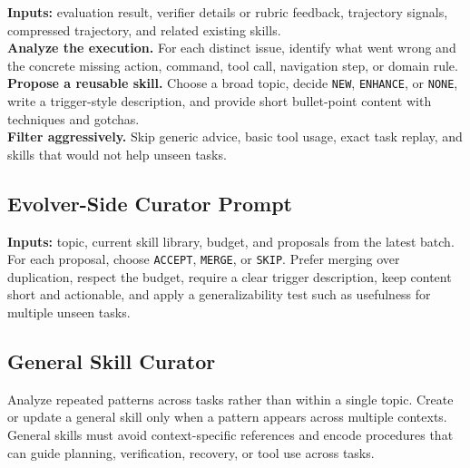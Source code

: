 \begin{tcolorbox}[breakable, colback=gray!5, colframe=gray!50, fontupper=\small,
title={\small Proposal prompt, compressed}]
\textbf{Inputs:} evaluation result, verifier details or rubric feedback,
trajectory signals, compressed trajectory, and related existing skills.\\[2pt]
\textbf{Analyze the execution.}
For each distinct issue, identify what went wrong and the concrete missing
action, command, tool call, navigation step, or domain rule.\\[2pt]
\textbf{Propose a reusable skill.}
Choose a broad topic, decide \texttt{NEW}, \texttt{ENHANCE}, or \texttt{NONE},
write a trigger-style description, and provide short bullet-point content with
techniques and gotchas.\\[2pt]
\textbf{Filter aggressively.}
Skip generic advice, basic tool usage, exact task replay, and skills that would
not help unseen tasks.
\end{tcolorbox}

\subsection{Evolver-Side Curator Prompt}

\begin{tcolorbox}[breakable, colback=gray!5, colframe=gray!50, fontupper=\small,
title={\small Curator prompt, compressed}]
\textbf{Inputs:} topic, current skill library, budget, and proposals from the
latest batch.\\[2pt]
For each proposal, choose \texttt{ACCEPT}, \texttt{MERGE}, or \texttt{SKIP}.
Prefer merging over duplication, respect the budget, require a clear trigger
description, keep content short and actionable, and apply a generalizability
test such as usefulness for multiple unseen tasks.
\end{tcolorbox}

\subsection{General Skill Curator}

\begin{tcolorbox}[breakable, colback=gray!5, colframe=gray!50, fontupper=\small,
title={\small General skill curator, compressed}]
Analyze repeated patterns across tasks rather than within a single topic.
Create or update a general skill only when a pattern appears across multiple
contexts. General skills must avoid context-specific references and encode
procedures that can guide planning, verification, recovery, or tool use across
tasks.
\end{tcolorbox}

